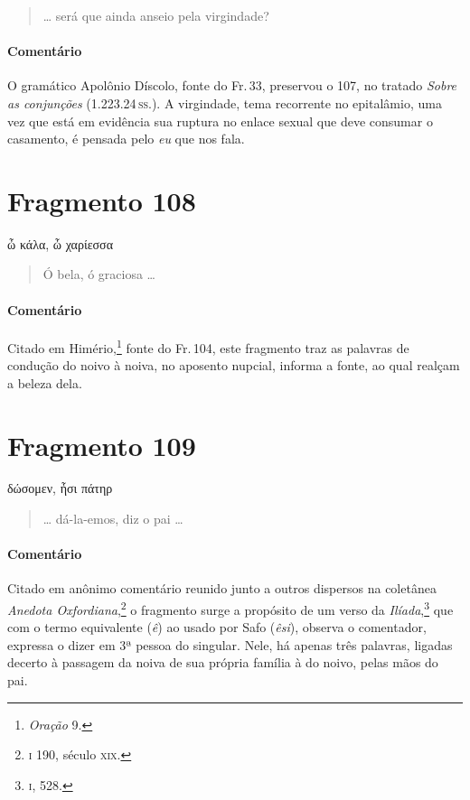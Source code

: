 {\begin{verse}
\ldots{} será que ainda anseio pela virgindade?
\end{verse}

\medskip

{\paragraph{Comentário} O gramático Apolônio Díscolo, fonte do Fr.\,33, preservou o 107, no tratado
\textit{Sobre as conjunções} (1.223.24\,\textsc{ss}.). A virgindade, tema recorrente no epitalâmio, uma
vez que está em evidência sua ruptura no enlace sexual que deve consumar o
casamento, é pensada pelo \textit{eu} que nos fala.}


\section{Fragmento 108}

\begin{gkverse}
ὦ κάλα, ὦ χαρίεσσα
\end{gkverse}

\begin{verse}
Ó bela, ó graciosa \ldots{}
\end{verse}

\medskip

{\paragraph{Comentário} Citado em Himério,\footnote{\textit{Oração} 9.} fonte do Fr.\,104, este fragmento traz as palavras de condução do noivo à noiva, no aposento nupcial, informa a fonte, ao qual realçam a beleza dela.}


\pagebreak
\section{Fragmento 109 }

\begin{gkverse}
δώσομεν, ἦσι πάτηρ
\end{gkverse}

\begin{verse}
\ldots{} dá-la-emos, diz o pai \ldots{}
\end{verse}

\medskip

\paragraph{Comentário} Citado em anônimo comentário reunido junto a outros dispersos na coletânea \textit{Anedota Oxfordiana},\footnote{\textsc{i} 190, século \textsc{xix}.} o fragmento surge a propósito de um verso da \textit{Ilíada},\footnote{\textsc{i}, 528.} que com o termo equivalente (\textit{ê}) ao usado por Safo (\textit{êsi}), observa o comentador, expressa o dizer em 3ª pessoa do singular. Nele, há apenas três palavras, ligadas decerto à passagem da noiva de sua própria família à do noivo, pelas mãos do pai.


}
